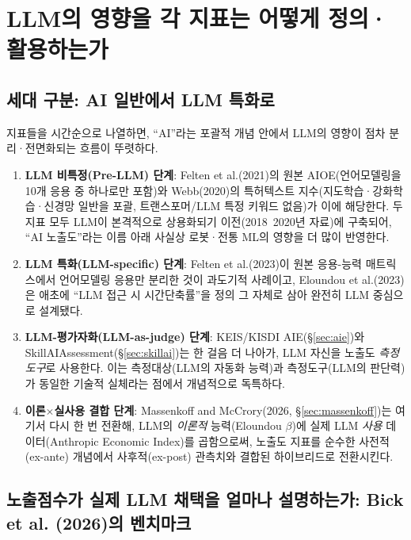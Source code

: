 \documentclass[11pt]{article}
\begin{document}
\section{LLM의 영향을 각 지표는 어떻게 정의·활용하는가}
\label{sec:llm-focus}

\subsection{세대 구분: AI 일반에서 LLM 특화로}

지표들을 시간순으로 나열하면, ``AI''라는 포괄적 개념 안에서 LLM의 영향이 점차 분리·전면화되는 흐름이 뚜렷하다.

\begin{enumerate}[label=(\arabic*)]
  \item \textbf{LLM 비특정(Pre-LLM) 단계}: Felten et al.(2021)의 원본 AIOE(언어모델링을 10개 응용 중 하나로만 포함)와 Webb(2020)의 특허텍스트 지수(지도학습·강화학습·신경망 일반을 포괄, 트랜스포머/LLM 특정 키워드 없음)가 이에 해당한다. 두 지표 모두 LLM이 본격적으로 상용화되기 이전(2018~2020년 자료)에 구축되어, ``AI 노출도''라는 이름 아래 사실상 로봇·전통 ML의 영향을 더 많이 반영한다.
  \item \textbf{LLM 특화(LLM-specific) 단계}: Felten et al.(2023)이 원본 응용-능력 매트릭스에서 언어모델링 응용만 분리한 것이 과도기적 사례이고, Eloundou et al.(2023)은 애초에 ``LLM 접근 시 시간단축률''을 정의 그 자체로 삼아 완전히 LLM 중심으로 설계됐다.
  \item \textbf{LLM-평가자화(LLM-as-judge) 단계}: KEIS/KISDI AIE(\S\ref{sec:aie})와 SkillAIAssessment(\S\ref{sec:skillai})는 한 걸음 더 나아가, LLM 자신을 노출도 \emph{측정도구}로 사용한다. 이는 측정대상(LLM의 자동화 능력)과 측정도구(LLM의 판단력)가 동일한 기술적 실체라는 점에서 개념적으로 독특하다.
  \item \textbf{이론$\times$실사용 결합 단계}: Massenkoff and McCrory(2026, \S\ref{sec:massenkoff})는 여기서 다시 한 번 전환해, LLM의 \emph{이론적} 능력(Eloundou $\beta$)에 실제 LLM \emph{사용} 데이터(Anthropic Economic Index)를 곱함으로써, 노출도 지표를 순수한 사전적(ex-ante) 개념에서 사후적(ex-post) 관측치와 결합된 하이브리드로 전환시킨다.
\end{enumerate}

\subsection{노출점수가 실제 LLM 채택을 얼마나 설명하는가: Bick et al. (2026)의 벤치마크}
\end{document}

